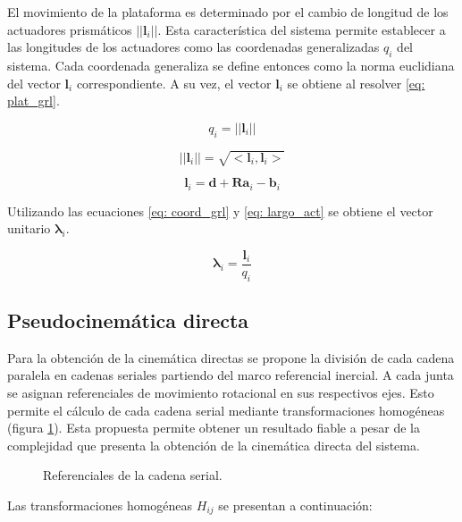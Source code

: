 El movimiento de la plataforma es determinado por el cambio de longitud
de los actuadores prismáticos $||\mathbf l_i||$.
Esta característica del sistema permite establecer
a las longitudes de los actuadores como las coordenadas 
generalizadas $q_i$ del sistema.
Cada coordenada generaliza se define entonces como la norma euclidiana
del vector $\mathbf l_i$ correspondiente.
A su vez, el vector $\mathbf l_i$ se obtiene al resolver 
\eqref{eq: plat_grl}.

\begin{equation} \label{eq: coord_grl}
    q_i = ||\mathbf l_i||
\end{equation}

\begin{equation} \label{eq: l}
    ||\mathbf l_i|| = \sqrt{<\mathbf l_i, \mathbf l_i>} 
\end{equation}

\begin{equation} \label{eq: largo_act}
\mathbf l_i = \mathbf d + \mathbf R \mathbf a_i - \mathbf b_i
\end{equation}

Utilizando las ecuaciones \ref{eq: coord_grl} y 
\ref{eq: largo_act} se obtiene el vector unitario 
$\boldsymbol \lambda_i$.

\begin{equation} \label{eq: vec_U}
\boldsymbol \lambda_i = \frac{\mathbf l_i}{q_i}
\end{equation}

\subsection{Pseudocinemática directa}

Para la obtención de la cinemática directas se propone la división de cada cadena paralela en 
cadenas seriales partiendo del marco referencial inercial.
A cada junta se asignan referenciales de movimiento rotacional  en sus
respectivos ejes.
Esto permite el cálculo de cada cadena serial mediante 
transformaciones homogéneas (figura \ref{fig: cadena serial}).
Esta propuesta permite obtener un resultado fiable a pesar de la 
complejidad que presenta la obtención de la 
cinemática directa del sistema.

\begin{figure}[htb!]
 \centering
 \caption{Referenciales de la cadena serial.}
 \label{fig: cadena serial}
\end{figure}

Las transformaciones homogéneas $H_{ij}$ se presentan a
continuación:

